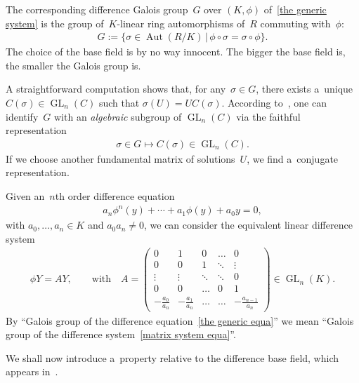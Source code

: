\documentclass[pdftex]{sigma}
\numberwithin{equation}{section}
\begin{document}
The corresponding dif\/ference Galois group~$G$ over $(K,\phi)$ of~\eqref{the generic system} is the group of~$K$-linear
ring automorphisms of~$R$ commuting with~$\phi$:
\begin{gather*}
G:=\{\sigma \in \operatorname{Aut}(R/K) \, | \, \phi\circ\sigma=\sigma\circ \phi \}.
\end{gather*}
The choice of the base f\/ield is by no way innocent.
The bigger the base f\/ield is, the smaller the Galois group is.

A straightforward computation shows that, for any~$\sigma {\in} G$, there exists a~unique ${C(\sigma) {\in}
\operatorname{GL}_{n}(C)}$ such that $\sigma(U)=UC(\sigma)$.
According to~\cite[Theorem~1.13]{VdPS97}, one can identify~$G$ with an {\it algebraic} subgroup of
$\operatorname{GL}_{n}(C)$ via the faithful representation
\begin{gather*}
\sigma \in G \mapsto C(\sigma) \in \operatorname{GL}_{n}(C).
\end{gather*}
If we choose another fundamental matrix of solutions~$U$, we f\/ind a~conjugate representation.

\begin{Remark}
Given an~$n$th order dif\/ference equation
\begin{gather}
\label{the generic equa}
a_{n} \phi^{n} (y) + \cdots + a_{1} \phi(y)+a_{0} y=0,
\end{gather}
with $a_{0},\dots,a_{n} \in K$ and $a_{0}a_{n} \neq 0$, we can consider the equivalent linear dif\/ference system
\begin{gather}
\label{matrix system equa}
\phi Y=AY, \qquad \text{with} \quad  A=
\begin{pmatrix}
0&1&0&\dots&0
\\
0&0&1&\ddots&\vdots
\\
\vdots&\vdots&\ddots&\ddots&0
\\
0&0&\dots&0&1
\\
-\frac{a_{0}}{a_{n}}& -\frac{a_{1}}{a_{n}}&\dots & \dots & -\frac{a_{n-1}}{a_{n}}
\end{pmatrix}
\in \operatorname{GL}_{n}(K).
\end{gather}
By ``Galois group of the dif\/ference equation~\eqref{the generic equa}'' we mean ``Galois group of the dif\/ference
system~\eqref{matrix system equa}''.
\end{Remark}

We shall now introduce a~property relative to the dif\/ference base f\/ield, which appears in~\cite[Lemma~1.19]{VdPS97}.
\end{document}
